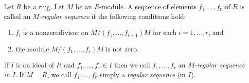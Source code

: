 \begin{definition}
\label{definition-regular-sequence}
Let $R$ be a ring. Let $M$ be an $R$-module. A sequence of elements
$f_1, \ldots, f_r$ of $R$ is called an {\it $M$-regular sequence}
if the following conditions hold:
\begin{enumerate}
\item $f_i$ is a nonzerodivisor on
$M/(f_1, \ldots, f_{i - 1})M$
for each $i = 1, \ldots, r$, and
\item the module $M/(f_1, \ldots, f_r)M$ is not zero.
\end{enumerate}
If $I$ is an ideal of $R$ and $f_1, \ldots, f_r \in I$
then we call $f_1, \ldots, f_r$ an {\it $M$-regular sequence
in $I$}. If $M = R$, we call $f_1, \ldots, f_r$ simply a
{\it regular sequence} (in $I$).
\end{definition}